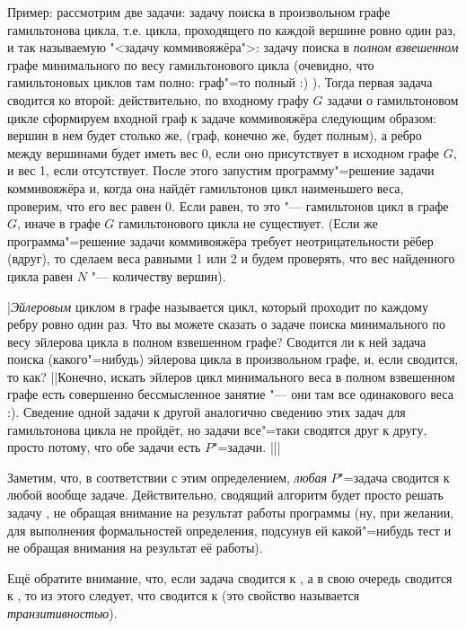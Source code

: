 {Пример: рассмотрим две задачи: задачу поиска в произвольном графе гамильтонова 
цикла, т.е. цикла, проходящего по каждой вершине ровно один раз, и так 
называемую "<задачу коммивояжёра">: задачу поиска в \textit{полном взвешенном} 
графе минимального по весу гамильтонового цикла (очевидно, что гамильтоновых циклов 
там полно: граф"=то полный :) ). Тогда первая задача сводится ко второй: 
действительно, по входному графу $G$ задачи о гамильтоновом цикле сформируем 
входной граф к задаче коммивояжёра следующим образом: вершин в нем будет столько же, (граф, 
конечно же, будет полным), а ребро между вершинами будет иметь вес 0, если оно 
присутствует в исходном графе $G$, и вес 1, если отсутствует. После этого 
запустим программу"=решение задачи коммивояжёра и, когда она найдёт гамильтонов 
цикл наименьшего веса, проверим, что его вес равен 0. Если равен, то это "--- 
гамильтонов цикл в графе $G$, иначе в графе $G$ гамильтонового цикла не 
существует. (Если же программа"=решение задачи коммивояжёра требует 
неотрицательности рёбер (вдруг), то сделаем веса равными 1 или 2 и будем 
проверять, что вес найденного цикла равен $N$ "--- количеству вершин).

\task|\textit{Эйлеровым} циклом в графе называется цикл, 
который проходит по каждому ребру ровно один раз. Что вы можете сказать о 
задаче поиска минимального по весу эйлерова цикла в полном взвешенном графе? 
Сводится ли к ней задача поиска (какого"=нибудь) эйлерова цикла в произвольном 
графе, и, если сводится, то как?
||Конечно, искать эйлеров цикл минимального веса в 
полном взвешенном графе есть совершенно бессмысленное занятие "--- они там все 
одинакового веса :). Сведение одной задачи к другой аналогично сведению этих 
задач для гамильтонова цикла не пройдёт, но задачи все"=таки сводятся друг к другу, 
просто потому, что обе задачи есть $P$"=задачи.
|||


Заметим, что, в соответствии с этим определением, \textit{любая} $P$"=задача 
сводится к любой вообще задаче. Действительно, сводящий алгоритм будет просто решать задачу 
\A, не обращая внимание на результат работы программы \B{} (ну, при желании, 
для выполнения формальностей определения, подсунув ей какой"=нибудь тест и не 
обращая внимания на результат её работы).

Ещё обратите внимание, что, если задача \A{} сводится к \B, а \B{} в свою 
очередь сводится к \CC, то из этого следует, что \A{} сводится к \CC{} (это 
свойство называется \textit{транзитивностью}).

}
